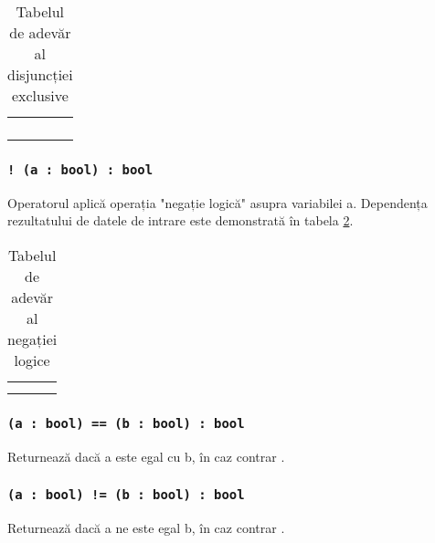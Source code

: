 \begin{table}[htb]
	\caption{Tabelul de adevăr al disjuncției exclusive}
	\label{logdifftable}
	\begin{tabular}{|c|c|c|}
		\hline
		\code{a} & \code{b} & \code{a \^ b} \\ \hline
		\false{} & \false{} & \false{}  	\\ \hline
		\false{} & \true{}  & \true{}   	\\ \hline
		\true{}  & \false{} & \true{}  		\\ \hline
		\true{}  & \true{}  & \false{}  	\\ \hline
	\end{tabular}
	\vspace{-2em}
\end{table}

\subsubsection{\lstinline|! (a : bool) : bool|}

Operatorul aplică operația "negație logică" asupra variabilei a. Dependența rezultatului de datele de intrare este demonstrată în tabela  \ref{invtable}.

\begin{table}[htb]
	\caption{Tabelul de adevăr al negației logice}
	\label{invtable}
	\begin{tabular}{|c|c|}
		\hline
		\code{a} & \code{!a} \\ \hline
		\false{} &  \true{}  \\ \hline
		\true{}  & \false{}  \\ \hline
	\end{tabular}
	\vspace{-2em}
\end{table}

\subsubsection{\lstinline|(a : bool) == (b : bool) : bool|}

Returnează \true{} dacă a este egal cu b, în caz contrar \false{}.

\subsubsection{\lstinline|(a : bool) != (b : bool) : bool|}

Returnează \true{} dacă a ne este egal b, în caz contrar \false{}.

